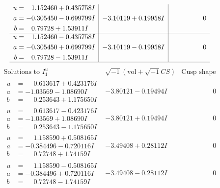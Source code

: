 \documentclass[1p]{elsarticle_modified}
\theoremstyle{definition}
\newcommand{\I}{\sqrt{-1}}
\begin{document}
$$\begin{array}{c|c|c}
\begin{aligned}
u &= \phantom{-}1.152460 + 0.435758 I \\
a &= -0.305450 - 0.699799 I \\
b &= \phantom{-}0.79728 + 1.53911 I\end{aligned}
 & -3.10119 + 0.19958 I & \phantom{-0.000000 } 0 \\ \hline\begin{aligned}
u &= \phantom{-}1.152460 - 0.435758 I \\
a &= -0.305450 + 0.699799 I \\
b &= \phantom{-}0.79728 - 1.53911 I\end{aligned}
 & -3.10119 - 0.19958 I & \phantom{-0.000000 } 0\\
 \hline 
 \end{array}$$\newpage$$\begin{array}{c|c|c}  
\text{Solutions to }I^u_{1}& \I (\text{vol} + \sqrt{-1}CS) & \text{Cusp shape}\\
 \hline 
\begin{aligned}
u &= \phantom{-}0.613617 + 0.423176 I \\
a &= -1.03569 - 1.08690 I \\
b &= \phantom{-}0.253643 + 1.175650 I\end{aligned}
 & -3.80121 - 0.19494 I & \phantom{-0.000000 } 0 \\ \hline\begin{aligned}
u &= \phantom{-}0.613617 - 0.423176 I \\
a &= -1.03569 + 1.08690 I \\
b &= \phantom{-}0.253643 - 1.175650 I\end{aligned}
 & -3.80121 + 0.19494 I & \phantom{-0.000000 } 0 \\ \hline\begin{aligned}
u &= \phantom{-}1.158590 + 0.508165 I \\
a &= -0.384496 - 0.720116 I \\
b &= \phantom{-}0.72748 + 1.74159 I\end{aligned}
 & -3.49408 + 0.28112 I & \phantom{-0.000000 } 0 \\ \hline\begin{aligned}
u &= \phantom{-}1.158590 - 0.508165 I \\
a &= -0.384496 + 0.720116 I \\
b &= \phantom{-}0.72748 - 1.74159 I\end{aligned}
 & -3.49408 - 0.28112 I & \phantom{-0.000000 } 0 \\ \hline\begin{aligned}

\end{aligned}
\end{array}$$
\end{document}
